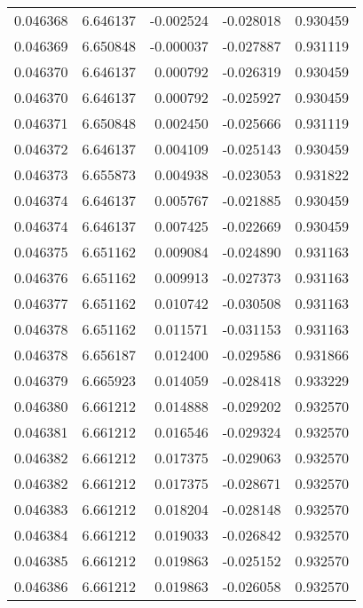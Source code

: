 \begin{tabular}{lrrrr}
0.046368    &  6.646137 & -0.002524 & -0.028018 &             0.930459 \\
0.046369    &  6.650848 & -0.000037 & -0.027887 &             0.931119 \\
0.046370    &  6.646137 &  0.000792 & -0.026319 &             0.930459 \\
0.046370    &  6.646137 &  0.000792 & -0.025927 &             0.930459 \\
0.046371    &  6.650848 &  0.002450 & -0.025666 &             0.931119 \\
0.046372    &  6.646137 &  0.004109 & -0.025143 &             0.930459 \\
0.046373    &  6.655873 &  0.004938 & -0.023053 &             0.931822 \\
0.046374    &  6.646137 &  0.005767 & -0.021885 &             0.930459 \\
0.046374    &  6.646137 &  0.007425 & -0.022669 &             0.930459 \\
0.046375    &  6.651162 &  0.009084 & -0.024890 &             0.931163 \\
0.046376    &  6.651162 &  0.009913 & -0.027373 &             0.931163 \\
0.046377    &  6.651162 &  0.010742 & -0.030508 &             0.931163 \\
0.046378    &  6.651162 &  0.011571 & -0.031153 &             0.931163 \\
0.046378    &  6.656187 &  0.012400 & -0.029586 &             0.931866 \\
0.046379    &  6.665923 &  0.014059 & -0.028418 &             0.933229 \\
0.046380    &  6.661212 &  0.014888 & -0.029202 &             0.932570 \\
0.046381    &  6.661212 &  0.016546 & -0.029324 &             0.932570 \\
0.046382    &  6.661212 &  0.017375 & -0.029063 &             0.932570 \\
0.046382    &  6.661212 &  0.017375 & -0.028671 &             0.932570 \\
0.046383    &  6.661212 &  0.018204 & -0.028148 &             0.932570 \\
0.046384    &  6.661212 &  0.019033 & -0.026842 &             0.932570 \\
0.046385    &  6.661212 &  0.019863 & -0.025152 &             0.932570 \\
0.046386    &  6.661212 &  0.019863 & -0.026058 &             0.932570 \\

\end{tabular}
